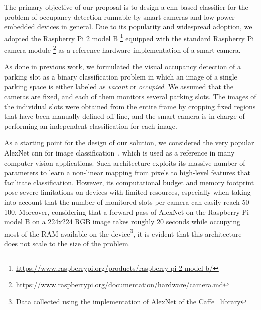 

The primary objective of our proposal is to design a \gls{cnn}-based classifier for the problem of occupancy detection runnable by smart cameras and low-power embedded devices in general.
Due to its popularity and widespread adoption, we adopted the Raspberry Pi 2 model B \footnote{\url{https://www.raspberrypi.org/products/raspberry-pi-2-model-b/}} equipped with the standard Raspberry Pi camera module \footnote{\url{https://www.raspberrypi.org/documentation/hardware/camera.md}} as a reference hardware implementation of a smart camera.

As done in previous work, we formulated the visual occupancy detection of a parking slot as a binary classification problem in which an image of a single parking space is either labeled as \emph{vacant} or \emph{occupied}.
We assumed that the cameras are fixed, and each of them monitors several parking slots.
The images of the individual slots were obtained from the entire frame by cropping fixed regions that have been manually defined off-line, and the smart camera is in charge of performing an independent classification for each image.

As a starting point for the design of our solution, we considered the very popular AlexNet \gls{cnn} for image classification~\cite{krizhevsky2012imagenet}, which is used as a reference in many computer vision applications. %
Such architecture exploits its massive number of parameters to learn a non-linear mapping from pixels to high-level features that facilitate classification.
However, its computational budget and memory footprint pose severe limitations on devices with limited resources, especially when taking into account that the number of monitored slots per camera can easily reach 50--100.
Moreover, considering that a forward pass of AlexNet on the Raspberry Pi model B on a 224x224 RGB image takes roughly 20 seconds while occupying most of the RAM available on the device\footnote{Data collected using the implementation of AlexNet of the Caffe~\cite{jia2014caffe} library}, it is evident that this architecture does not scale to the size of the problem.

